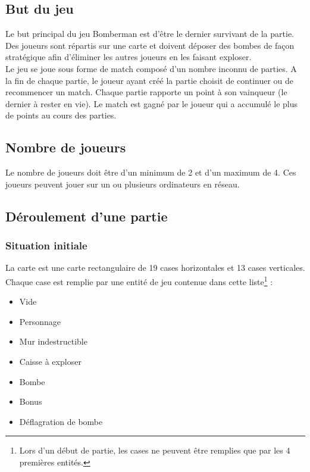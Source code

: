 \subsection{But du jeu}

Le but principal du jeu Bomberman est d'être le dernier survivant de la partie. Des joueurs sont répartis sur une carte et doivent déposer des bombes de façon stratégique afin d'éliminer les autres joueurs en les faisant exploser.\\

Le jeu se joue sous forme de match composé d'un nombre inconnu de parties. A la fin de chaque partie, le joueur ayant créé la partie choisit de continuer ou de recommencer un match. Chaque partie rapporte un point à son vainqueur (le dernier à rester en vie). Le match est gagné par le joueur qui a accumulé le plus de points au cours des parties.

\subsection{Nombre de joueurs}

Le nombre de joueurs doit être d'un minimum de 2 et d'un maximum de 4. Ces joueurs peuvent jouer sur un ou plusieurs ordinateurs en réseau.

\subsection{Déroulement d'une partie}

\subsubsection{Situation initiale}

La carte est une carte rectangulaire de 19 cases horizontales et 13 cases verticales. Chaque case est remplie par une entité de jeu contenue dans cette liste\footnote{Lors d'un début de partie, les cases ne peuvent être remplies que par les 4 premières entités.} :

\begin{itemize}
    \item Vide
    \item Personnage
    \item Mur indestructible
    \item Caisse à exploser
    \item Bombe
    \item Bonus
    \item Déflagration de bombe
\end{itemize}

